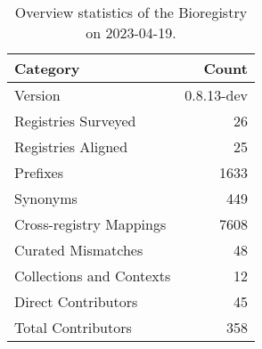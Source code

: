 \begin{table}
\caption{Overview statistics of the Bioregistry on 2023-04-19.}
\label{tab:bioregistry-summary}
\begin{tabular}{lr}
\toprule
Category & Count \\
\midrule
Version & 0.8.13-dev \\
Registries Surveyed & 26 \\
Registries Aligned & 25 \\
Prefixes & 1633 \\
Synonyms & 449 \\
Cross-registry Mappings & 7608 \\
Curated Mismatches & 48 \\
Collections and Contexts & 12 \\
Direct Contributors & 45 \\
Total Contributors & 358 \\
\bottomrule
\end{tabular}
\end{table}

